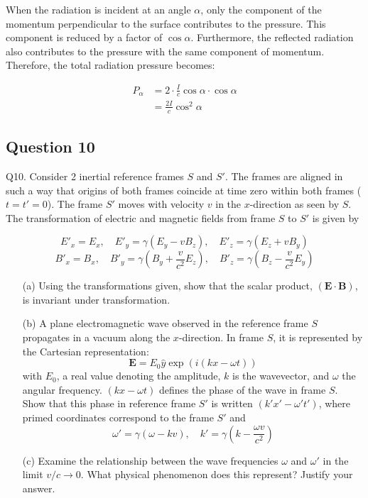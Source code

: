 \documentclass{article}
\begin{document}
When the radiation is incident at an angle $\alpha$, only the component of the momentum perpendicular to the surface contributes to the pressure. This component is reduced by a factor of $\cos \alpha$.  Furthermore, the reflected radiation also contributes to the pressure with the same component of momentum.  Therefore, the total radiation pressure becomes:

\begin{align*}
P_\alpha &= 2 \cdot \frac{I}{c} \cos \alpha \cdot \cos \alpha \\
&= \frac{2I}{c} \cos^2 \alpha
\end{align*}


\subsection{Question 10}
Q10. Consider 2 inertial reference frames \( S \) and \( S' \). The frames are aligned in such a way that origins of both frames coincide at time zero within both frames (\( t = t' = 0 \)). The frame \( S' \) moves with velocity \( v \) in the \( x \)-direction as seen by \( S \). The transformation of electric and magnetic fields from frame \( S \) to \( S' \) is given by 

\[
E'_x = E_x, \quad E'_y = \gamma (E_y - v B_z), \quad E'_z = \gamma (E_z + v B_y)
\]
\[
B'_x = B_x, \quad B'_y = \gamma \left( B_y + \frac{v}{c^2} E_z \right), \quad B'_z = \gamma \left( B_z - \frac{v}{c^2} E_y \right)
\]

\begin{enumerate}
    \item[(a)] Using the transformations given, show that the scalar product, \( (\mathbf{E} \cdot \mathbf{B}) \), is invariant under transformation.
    
    \item[(b)] A plane electromagnetic wave observed in the reference frame \( S \) propagates in a vacuum along the \( x \)-direction. In frame \( S \), it is represented by the Cartesian representation:
    \[
    \mathbf{E} = E_0 \hat{y} \exp \left( i (k x - \omega t) \right)
    \]
    with \( E_0 \), a real value denoting the amplitude, \( k \) is the wavevector, and \( \omega \) the angular frequency. \( (kx - \omega t) \) defines the phase of the wave in frame \( S \). Show that this phase in reference frame \( S' \) is written \( (k' x' - \omega' t') \), where primed coordinates correspond to the frame \( S' \) and 
    \[
    \omega' = \gamma (\omega - k v), \quad k' = \gamma \left( k - \frac{\omega v}{c^2} \right)
    \]

    \item[(c)] Examine the relationship between the wave frequencies \( \omega \) and \( \omega' \) in the limit \( v / c \to 0 \). What physical phenomenon does this represent? Justify your answer.
\end{enumerate}
\end{document}
